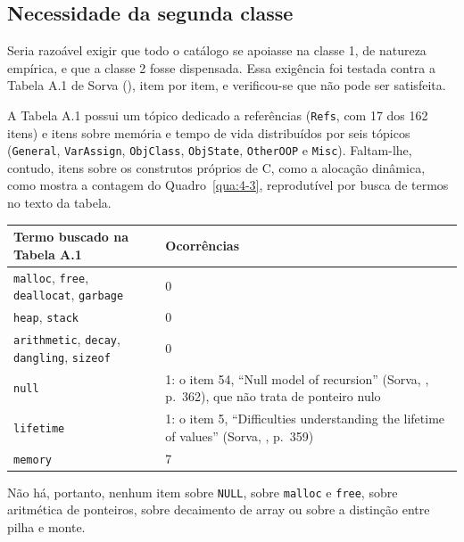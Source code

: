 \subsection{Necessidade da segunda classe}

Seria razoável exigir que todo o catálogo se apoiasse na classe 1, de natureza empírica, e que a classe 2 fosse dispensada. Essa exigência foi testada contra a Tabela A.1 de Sorva (\citeyear{sorva2012}), item por item, e verificou-se que não pode ser satisfeita.

A Tabela A.1 possui um tópico dedicado a referências (\texttt{Refs}, com 17 dos 162 itens) e itens sobre memória e tempo de vida distribuídos por seis tópicos (\texttt{General}, \texttt{VarAssign}, \texttt{ObjClass}, \texttt{ObjState}, \texttt{OtherOOP} e \texttt{Misc}). Faltam-lhe, contudo, itens sobre os construtos próprios de C, como a alocação dinâmica, como mostra a contagem do Quadro~\ref{qua:4-3}, reprodutível por busca de termos no texto da tabela.

\begin{quadro}[htbp]
\caption{Ocorrências de termos relativos à memória na Tabela A.1}\label{qua:4-3}
\footnotesize
\begin{tabularx}{\textwidth}{|X|X|}
\hline
\textbf{Termo buscado na Tabela A.1} & \textbf{Ocorrências} \\ \hline
\texttt{malloc}, \texttt{free}, \texttt{deallocat}, \texttt{garbage} & 0 \\ \hline
\texttt{heap}, \texttt{stack} & 0 \\ \hline
\texttt{arithmetic}, \texttt{decay}, \texttt{dangling}, \texttt{sizeof} & 0 \\ \hline
\texttt{null} & 1: o item 54, ``Null model of recursion'' (Sorva, \citeyear{sorva2012}, p.~362), que não trata de ponteiro nulo \\ \hline
\texttt{lifetime} & 1: o item 5, ``Difficulties understanding the lifetime of values'' (Sorva, \citeyear{sorva2012}, p.~359) \\ \hline
\texttt{memory} & 7 \\ \hline
\end{tabularx}
\end{quadro}

Não há, portanto, nenhum item sobre \texttt{NULL}, sobre \texttt{malloc} e \texttt{free}, sobre aritmética de ponteiros, sobre decaimento de array ou sobre a distinção entre pilha e monte.

